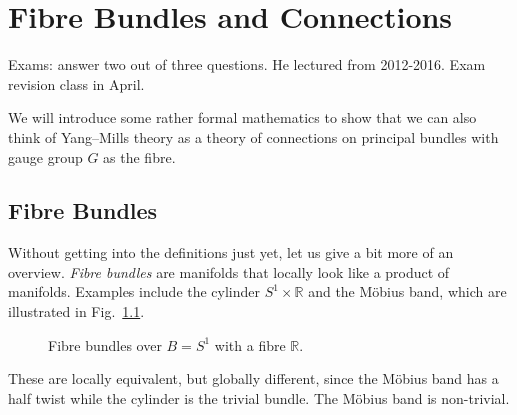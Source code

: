 
\chapter{Fibre Bundles and Connections}%
\label{cha:fibre_bundles_and_connections}

\begin{leftbar}
  Exams: answer two out of three questions. He lectured from 2012-2016.
  Exam revision class in April.
\end{leftbar}

We will introduce some rather formal mathematics to show that we can also think of Yang--Mills theory as a theory of connections on principal bundles with gauge group $G$ as the fibre.

\section{Fibre Bundles}%
\label{sec:fibre_bundles}

Without getting into the definitions just yet, let us give a bit more of an overview.
\emph{Fibre bundles} are manifolds that locally look like a product of manifolds.
Examples include the cylinder $S^1 \times \mathbb{R}$ and the Möbius band, which are illustrated in Fig.~\ref{fig:fibre-bundles}.
\begin{figure}[tbhp]
  \centering
  \caption{Fibre bundles over $B = S^1$ with a fibre $\mathbb{R}$.}
  \label{fig:fibre-bundles}
\end{figure}
These are locally equivalent, but globally different, since the Möbius band has a half twist while the cylinder is the trivial bundle. The Möbius band is non-trivial. 

